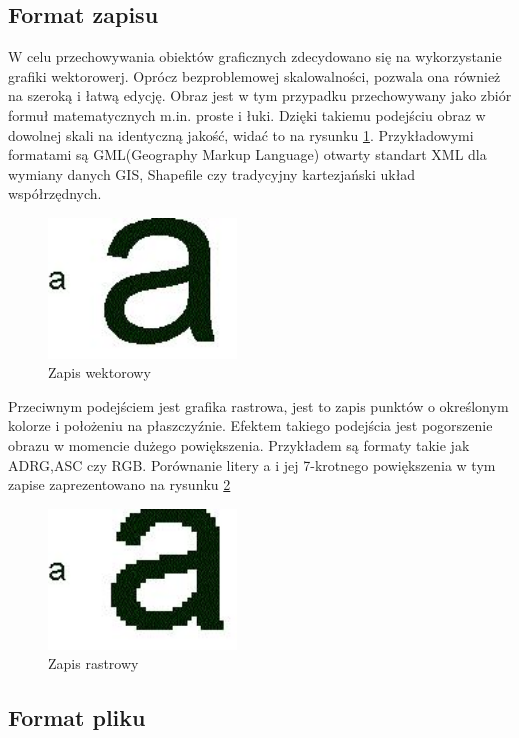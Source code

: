 \subsection{Format zapisu}
\label{subsec:zapisWektorowy}

W celu przechowywania obiektów graficznych zdecydowano się na wykorzystanie grafiki wektorowerj. Oprócz bezproblemowej skalowalności, pozwala ona również na szeroką i łatwą edycję. 
Obraz jest w tym przypadku przechowywany jako zbiór formuł matematycznych m.in. proste i łuki. Dzięki takiemu podejściu obraz w dowolnej skali na identyczną jakość, widać to na rysunku \ref{fig:wekt}. Przykładowymi formatami są GML(Geography Markup Language) otwarty standart XML dla wymiany danych GIS, Shapefile czy tradycyjny kartezjański układ współrzędnych.

  \begin{figure}[H]
  \centering
    \includegraphics[width=50mm]{ge/a1.jpg}
  \caption{Zapis wektorowy}
  \label{fig:wekt}
  \end{figure}

Przeciwnym podejściem jest grafika rastrowa, jest to zapis punktów o określonym kolorze i położeniu na płaszczyźnie.  Efektem takiego podejścia jest pogorszenie obrazu w momencie dużego powiększenia. Przykładem są formaty takie jak ADRG,ASC czy RGB.
Porównanie litery a i jej 7-krotnego powiększenia w tym zapise zaprezentowano na rysunku \ref{fig:rast}
  \begin{figure}[H]
  \centering
    \includegraphics[width=50mm]{ge/a2.jpg}
  \caption{Zapis rastrowy}
  \label{fig:rast}
  \end{figure}

\subsection{Format pliku}
\label{subsec:fileformat}

